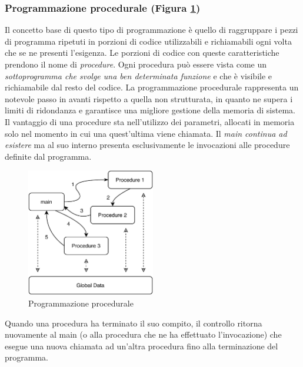 \subsubsection{Programmazione procedurale (Figura \ref{fig:procedural-programming})}
Il concetto base di questo tipo di programmazione è quello di raggruppare i pezzi di programma ripetuti in porzioni di codice utilizzabili e richiamabili ogni volta che se ne presenti l’esigenza. Le porzioni di codice con queste caratteristiche prendono il nome di \textit{procedure}. Ogni procedura può essere vista come un \textit{sottoprogramma che svolge una ben determinata funzione} e che è visibile e richiamabile dal resto del codice. La programmazione procedurale rappresenta un notevole passo in avanti rispetto a quella non strutturata, in quanto ne supera i limiti di ridondanza e garantisce una migliore gestione della memoria di sistema. Il vantaggio di una procedure sta nell'utilizzo dei parametri, allocati in memoria solo nel momento in cui una quest'ultima viene chiamata. Il \textit{main continua ad esistere} ma al suo interno presenta esclusivamente le invocazioni alle procedure definite dal programma. 
\begin{figure}[H]
    \centering
    \includegraphics[width=0.50\textwidth]{images/01_2_procedural_programming.pdf}
    \caption{Programmazione procedurale}
    \label{fig:procedural-programming}
\end{figure}
Quando una procedura ha terminato il suo compito, il controllo ritorna nuovamente al main (o alla procedura che ne ha effettuato l’invocazione) che esegue una nuova chiamata ad un’altra procedura fino alla terminazione del programma.

